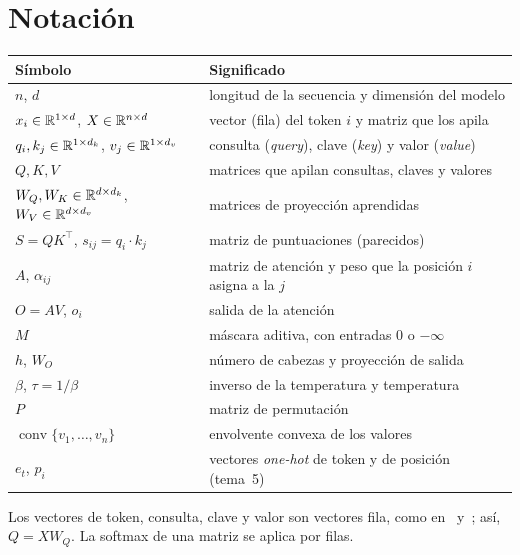 \documentclass[11pt,a4paper,twoside,openany]{book}
\newcommand{\T}{^{\top}}
\newcommand{\conv}{\operatorname{conv}}
\newcommand{\WQ}{W_{Q}}
\newcommand{\WK}{W_{K}}
\newcommand{\WV}{W_{V}}
\newcommand{\WO}{W_{O}}
\begin{document}
\section*{Notación}
\begin{center}
\begin{tabular}{@{}ll@{}}
\toprule
Símbolo & Significado \\
\midrule
$n$, $d$ & longitud de la secuencia y dimensión del modelo \\
$x_i\in\mathbb{R}^{1\times d}$, $X\in\mathbb{R}^{n\times d}$ & vector (fila) del token $i$ y matriz que los apila \\
$q_i,k_j\in\mathbb{R}^{1\times d_k}$, $v_j\in\mathbb{R}^{1\times d_v}$ & consulta (\emph{query}), clave (\emph{key}) y valor (\emph{value}) \\
$Q,K,V$ & matrices que apilan consultas, claves y valores \\
$\WQ,\WK\in\R^{d\times d_k}$, $\WV\in\R^{d\times d_v}$ & matrices de proyección aprendidas \\
$S=QK\T$, $s_{ij}=q_i\cdot k_j$ & matriz de puntuaciones (parecidos) \\
$A$, $\alpha_{ij}$ & matriz de atención y peso que la posición $i$ asigna a la $j$ \\
$O=AV$, $o_i$ & salida de la atención \\
$M$ & máscara aditiva, con entradas $0$ o $-\infty$ \\
$h$, $\WO$ & número de cabezas y proyección de salida \\
$\beta$, $\tau=1/\beta$ & inverso de la temperatura y temperatura \\
$P$ & matriz de permutación \\
$\conv\{v_1,\dots,v_n\}$ & envolvente convexa de los valores \\
$e_t$, $p_i$ & vectores \emph{one-hot} de token y de posición (tema~5) \\
\bottomrule
\end{tabular}
\end{center}
Los vectores de token, consulta, clave y valor son vectores fila, como en~\cite{vaswani} y~\cite{jm3}; así, $Q=X\WQ$. La softmax de una matriz se aplica por filas.

\tableofcontents

\mainmatter






\appendix


\backmatter

\end{document}

